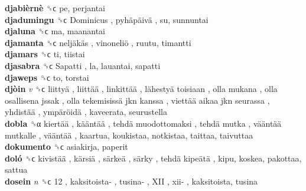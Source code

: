 \textbf{djabièrnè} ␝ϲ  pe, perjantai  \\
\textbf{djadumingu} ␝ϲ   Dominicus ,  pyhäpäivä , su, sunnuntai  \\
\textbf{djaluna} ␝ϲ  ma, maanantai  \\
\textbf{djamanta} ␝ϲ   neljäkäs ,  vinoneliö , ruutu, timantti  \\
\textbf{djamars} ␝ϲ  ti, tiistai  \\
\textbf{djasabra} ␝ϲ   Sapatti , la, lauantai, sapatti  \\
\textbf{djaweps} ␝ϲ  to, torstai  \\
\textbf{djòin} \emph{v}  ␝ϲ   liittyä ,  liittää ,  linkittää ,  lähestyä toisiaan ,  olla mukana ,  olla osallisena jssak ,  olla tekemisissä jkn kanssa ,  viettää aikaa jkn seurassa ,  yhdistää ,  ympäröidä , kaveerata, seurustella  \\
\textbf{dobla} ␝α   kiertää ,  kääntää ,  tehdä muodottomaksi ,  tehdä mutka ,  vääntää mutkalle ,  vääntää , kaartua, koukistaa, notkistaa, taittaa, taivuttaa  \\
\textbf{dokumento} ␝ϲ  asiakirja, paperit  \\
\textbf{doló} ␝ϲ   kivistää ,  kärsiä ,  särkeä ,  särky ,  tehdä kipeätä , kipu, koskea, pakottaa, sattua  \\
\textbf{dosein} \emph{n}  ␝ϲ   12 ,  kaksitoista- ,  tusina- ,  XII ,  xii- , kaksitoista, tusina  \\

